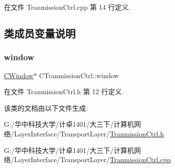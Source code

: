 在文件 Tranmission\+Ctrl.\+cpp 第 14 行定义.



\subsection{类成员变量说明}
\mbox{\label{class_c_tranmission_ctrl_a78277227cfa57679025eaffe98b3807c}} 
\subsubsection{\texorpdfstring{window}{window}}
{\footnotesize\ttfamily \hyperlink{class_c_window}{C\+Window}$\ast$ C\+Tranmission\+Ctrl\+::window}



在文件 Tranmission\+Ctrl.\+h 第 12 行定义.



该类的文档由以下文件生成\+:\begin{DoxyCompactItemize}
\item 
G\+:/华中科技大学/计卓1401/大三下/计算机网络/\+Layer\+Interface/\+Transport\+Layer/\hyperlink{_tranmission_ctrl_8h}{Tranmission\+Ctrl.\+h}\item 
G\+:/华中科技大学/计卓1401/大三下/计算机网络/\+Layer\+Interface/\+Transport\+Layer/\hyperlink{_tranmission_ctrl_8cpp}{Tranmission\+Ctrl.\+cpp}\end{DoxyCompactItemize}
